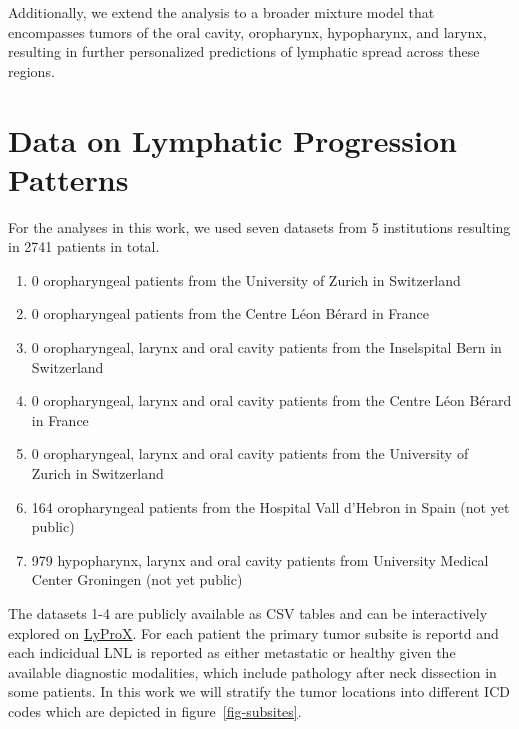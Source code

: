 \documentclass[
  sn-mathphys-num,
]{sn-jnl}
\providecommand{\tightlist}{%
  \setlength{\itemsep}{0pt}\setlength{\parskip}{0pt}}\usepackage{longtable,booktabs,array}
\begin{document}
Additionally, we extend the analysis to a broader mixture model that
encompasses tumors of the oral cavity, oropharynx, hypopharynx, and
larynx, resulting in further personalized predictions of lymphatic
spread across these regions.

\section{Data on Lymphatic Progression Patterns}\label{sec-data}

For the analyses in this work, we used seven datasets from 5
institutions resulting in 2741 patients in total.

\begin{enumerate}
\def\labelenumi{\arabic{enumi}.}
\tightlist
\item
  0 oropharyngeal patients from the University of Zurich in Switzerland
\item
  0 oropharyngeal patients from the Centre Léon Bérard in France
\item
  0 oropharyngeal, larynx and oral cavity patients from the Inselspital
  Bern in Switzerland
\item
  0 oropharyngeal, larynx and oral cavity patients from the Centre Léon
  Bérard in France
\item
  0 oropharyngeal, larynx and oral cavity patients from the University
  of Zurich in Switzerland
\item
  164 oropharyngeal patients from the Hospital Vall d'Hebron in Spain
  (not yet public)
\item
  979 hypopharynx, larynx and oral cavity patients from University
  Medical Center Groningen (not yet public)
\end{enumerate}

The datasets 1-4 are publicly available as CSV tables
\citep{ludwig_multi-centric_2023, ludwig_detailed_2022} and can be
interactively explored on \href{https://lyprox.org}{LyProX}. For each
patient the primary tumor subsite is reportd and each indicidual LNL is
reported as either metastatic or healthy given the available diagnostic
modalities, which include pathology after neck dissection in some
patients. In this work we will stratify the tumor locations into
different ICD codes which are depicted in figure~\ref{fig-subsites}.
\end{document}
